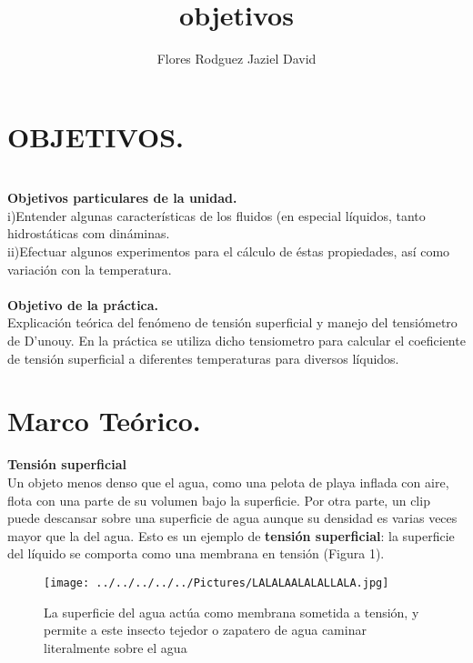 \documentclass[11pt,a4paper]{article}
\author{Flores Rodguez Jaziel David }
\title{objetivos}
\begin{document}
\section*{OBJETIVOS.}
\\
\textbf{Objetivos particulares de la unidad.}\\
i)Entender algunas caracter\'{i}sticas de los fluidos (en especial l\'{i}quidos, tanto hidrost\'{a}ticas com din\'{a}minas.\\
ii)Efectuar algunos experimentos para el c\'{a}lculo de \'{e}stas propiedades, as\'{i} como variaci\'{o}n con la temperatura.\\
\\
\textbf{Objetivo de la pr\'a{}ctica.}\\
Explicaci\'{o}n te\'{o}rica del fen\'{o}meno de tensi\'{o}n superficial y manejo del tensi\'{o}metro de D'unouy. En la pr\'{a}ctica se utiliza dicho tensiometro para calcular el coeficiente de tensi\'{o}n superficial a diferentes temperaturas para diversos l\'{i}quidos.\\
\section{Marco Te\'{o}rico.}
\textbf{Tensi\'{o}n superficial} 
\\
Un objeto menos denso que el agua, como una pelota de playa inflada con aire, flota con una parte de su volumen bajo la superficie. Por otra parte, un clip puede descansar sobre una superficie de agua aunque su densidad es varias veces mayor que la del agua. Esto es un ejemplo de \textbf{tensi\'{o}n superficial}: la superficie del l\'{i}quido se comporta como una membrana en tensi\'{o}n (Figura 1).
\\
\begin{figure}[hbtp]
\centering
\texttt{[image: ../../../../../Pictures/LALALAALALALLALA.jpg]}
\caption{La superficie del agua act\'{u}a como membrana sometida a tensi\'{o}n, y permite a este insecto tejedor o zapatero de agua caminar literalmente sobre el agua}
\end{figure}
\\
\end{document}
